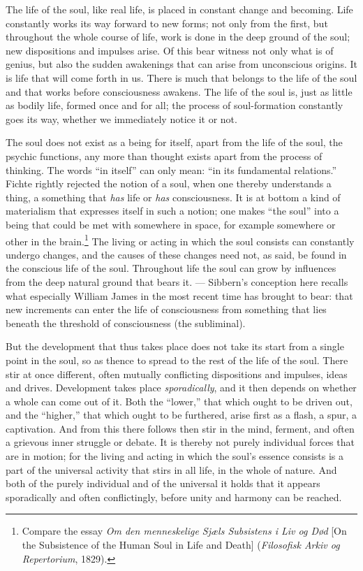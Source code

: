 \documentclass[12pt,a4paper]{book}
\newcommand{\opage}[1]{\marginnote{\footnotesize\textit{[#1]}}}
\begin{document}
The life of the soul, like real life, is placed in constant change and becoming. Life
constantly works its way forward to new forms; \opage{100}not only from the first, but throughout the
whole course of life, work is done in the deep ground of the soul; new dispositions and
impulses arise. Of this bear witness not only what is of genius, but also the sudden
awakenings that can arise from unconscious origins. It is life that will come forth in us.
There is much that belongs to the life of the soul and that works before consciousness
awakens. The life of the soul is, just as little as bodily life, formed once and for all;
the process of soul-formation constantly goes its way, whether we immediately notice it or
not.

The soul does not exist as a being for itself, apart from the life of the soul, the psychic
functions, any more than thought exists apart from the process of thinking. The words ``in
itself'' can only mean: ``in its fundamental relations.'' Fichte rightly rejected the
notion of a soul, when one thereby understands a thing, a something that \emph{has} life or
\emph{has} consciousness. It is at bottom a kind of materialism that expresses itself in
such a notion; one makes ``the soul'' into a being that could be met with somewhere in
space, for example somewhere or other in the brain.\footnote{Compare the essay \emph{Om den
menneskelige Sjæls Subsistens i Liv og Død} [On the Subsistence of the Human Soul in Life
and Death] (\emph{Filosofisk Arkiv og Repertorium}, 1829).} The living or acting in which
the soul consists can constantly undergo changes, and the causes of these changes need not,
as said, be found in the conscious life of the soul. Throughout life the soul can grow by
influences from the deep natural ground that bears it. --- Sibbern's conception here recalls
what especially William James in the most recent time has brought to bear: that new
increments can enter the life of consciousness from something that lies beneath the
threshold of consciousness (the subliminal).

But the development that thus takes place does not take its start from a single point in the
soul, so as thence to spread to the rest of the life of the soul. There stir at once
different, often mutually conflicting dispositions and impulses, ideas and drives.
Development takes place \emph{sporadically}, and it then depends on whether a whole can come
out of it. Both the ``lower,'' that which ought to be driven out, and the ``higher,'' that
which ought to be furthered, arise first as a flash, a spur, a \opage{101}captivation. And from this
there follows then stir in the mind, ferment, and often a grievous inner struggle or debate.
It is thereby not purely individual forces that are in motion; for the living and acting in
which the soul's essence consists is a part of the universal activity that stirs in all
life, in the whole of nature. And both of the purely individual and of the universal it
holds that it appears sporadically and often conflictingly, before unity and harmony can be
reached.
\end{document}
